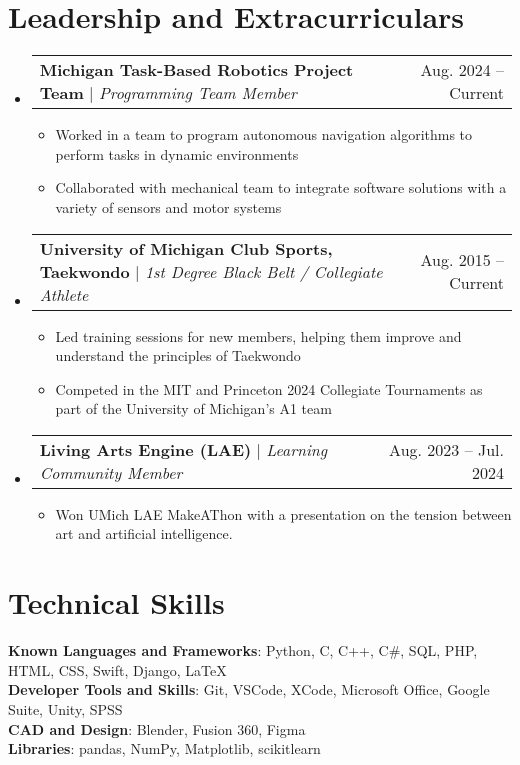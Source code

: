 \documentclass[letterpaper,11pt]{article}
\makeatletter
\newcommand{\resumeItem}[1]{
  \item\small{
    {#1 \vspace{-2.5pt}}
  }
}
\newcommand{\resumeProjectHeading}[2]{
    \item
    \begin{tabular*}{.98\textwidth}{l@{\extracolsep{\fill}}r}
      \small#1 & #2 \\
    \end{tabular*}\vspace{-7pt}
}
\newcommand{\resumeSubHeadingListStart}{\begin{itemize}[leftmargin=0in, label={}]}
\newcommand{\resumeSubHeadingListEnd}{\end{itemize}}
\newcommand{\resumeItemListStart}{\begin{itemize}}
\newcommand{\resumeItemListEnd}{\end{itemize}\vspace{-6pt}}
\makeatother
\begin{document}
\section{Leadership and Extracurriculars} 
    \resumeSubHeadingListStart
        \resumeProjectHeading
          {\textbf{Michigan Task-Based Robotics Project Team} $|$ \emph{Programming Team Member}}{Aug. 2024 -- Current}
          \resumeItemListStart
            \resumeItem{Worked in a team to program autonomous navigation algorithms to perform tasks in dynamic environments}
            \resumeItem{Collaborated with mechanical team to integrate software solutions with a variety of sensors and motor systems}
          \resumeItemListEnd

        \resumeProjectHeading
          {\textbf{University of Michigan Club Sports, Taekwondo} $|$ \emph{1st Degree Black Belt / Collegiate Athlete}}{Aug. 2015 -- Current}
          \resumeItemListStart
            \resumeItem{Led training sessions for new members, helping them improve and understand the principles of Taekwondo}
            \resumeItem{Competed in the MIT and Princeton 2024 Collegiate Tournaments as part of the University of Michigan's A1 team}
          \resumeItemListEnd

        \resumeProjectHeading
          {\textbf{Living Arts Engine (LAE)} $|$ \emph{Learning Community Member}}{Aug. 2023 -- Jul. 2024}
          \resumeItemListStart
            \resumeItem{Won UMich LAE MakeAThon with a presentation on the tension between art and artificial intelligence.}
          \resumeItemListEnd

    \resumeSubHeadingListEnd

%
\section{Technical Skills}
 \begin{itemize}[leftmargin=0.15in, label={}]
    \small{\item{
     \textbf{Known Languages and Frameworks}{: Python, C, C++, C\#, SQL, PHP, HTML, CSS, Swift, Django, LaTeX} \\
     \textbf{Developer Tools and Skills}{: Git, VSCode, XCode, Microsoft Office, Google Suite, Unity, SPSS} \\
     \textbf{CAD and Design}{: Blender, Fusion 360, Figma} \\
     \textbf{Libraries}{: pandas, NumPy, Matplotlib, scikitlearn} \\ }
     }
 \end{itemize}


\end{document}
